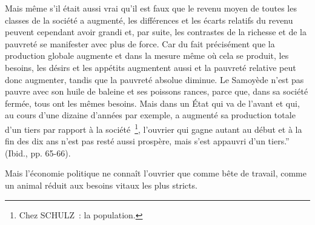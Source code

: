 \documentclass[french,twoside]{book} %
\newenvironment{quoteblock}%
  {\begin{quoting}}
  {\end{quoting}}
\newenvironment{quotebar}{%
    \def\FrameCommand{{\color{rubric!10!}\vrule width 0.5em} \hspace{0.9em}}%
    \def\OuterFrameSep{\itemsep} %
    \MakeFramed {\advance\hsize-\width \FrameRestore}
  }%
  {%
    \endMakeFramed
  }
\renewenvironment{quoteblock}%
  {%
    \savenotes
    \setstretch{0.9}
    \normalfont
    \begin{quotebar}
  }
  {%
    \end{quotebar}
    \spewnotes
  }
\begin{document}
\begin{quoteblock}
 Mais même s’il était aussi vrai qu’il est faux que le revenu moyen de toutes les classes de la société a augmenté, les différences et les écarts relatifs du revenu peuvent cependant avoir grandi et, par suite, les contrastes de la richesse et de la pauvreté se manifester avec plus de force. Car du fait précisément que la production globale augmente et dans la mesure même où cela se produit, les besoins, les désirs et les appétits augmentent aussi et la pauvreté relative peut donc augmenter, tandis que la pauvreté absolue diminue. Le Samoyède n’est pas pauvre avec son huile de baleine et ses poissons rances, parce que, dans sa société fermée, tous ont les mêmes besoins. Mais dans un État qui va de l’avant et qui, au cours d’une dizaine d’années par exemple, a augmenté sa production totale d’un tiers par rapport à la société \footnote{Chez SCHULZ : la population.}, l’ouvrier qui gagne autant au début et à la fin des dix ans n’est pas resté aussi prospère, mais s’est appauvri d’un tiers.” (Ibid., pp. 65-66).
 \end{quoteblock}

\noindent Mais l’économie politique ne connaît l’ouvrier que comme bête de travail, comme un animal réduit aux besoins vitaux les plus stricts.\par
\end{document}
